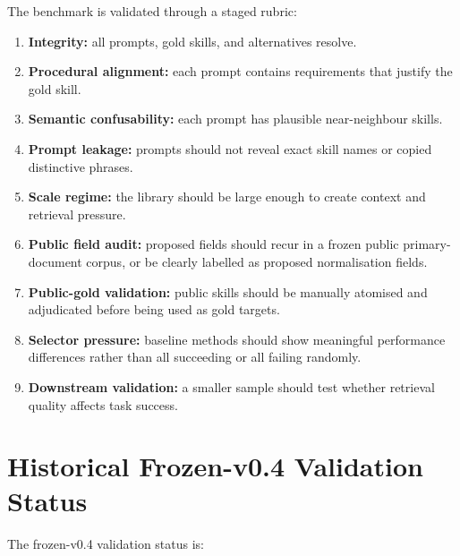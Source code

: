 The benchmark is validated through a staged rubric:

\begin{enumerate}
  \item \textbf{Integrity:} all prompts, gold skills, and alternatives resolve.
  \item \textbf{Procedural alignment:} each prompt contains requirements that justify the gold skill.
  \item \textbf{Semantic confusability:} each prompt has plausible near-neighbour skills.
  \item \textbf{Prompt leakage:} prompts should not reveal exact skill names or copied distinctive phrases.
  \item \textbf{Scale regime:} the library should be large enough to create context and retrieval pressure.
  \item \textbf{Public field audit:} proposed fields should recur in a frozen public primary-document corpus, or be clearly labelled as proposed normalisation fields.
  \item \textbf{Public-gold validation:} public skills should be manually atomised and adjudicated before being used as gold targets.
  \item \textbf{Selector pressure:} baseline methods should show meaningful performance differences rather than all succeeding or all failing randomly.
  \item \textbf{Downstream validation:} a smaller sample should test whether retrieval quality affects task success.
\end{enumerate}

\section{Historical Frozen-v0.4 Validation Status}

The frozen-v0.4 validation status is:

